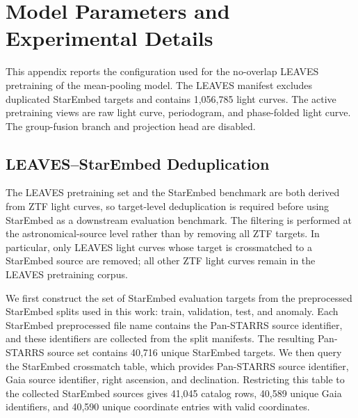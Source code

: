 \section{Model Parameters and Experimental Details}
\label{app:model_parameters_experimental_details}
\providecommand{\modelappendixfigdir}{runs/appendix_figures/mean_pooling_model}

This appendix reports the configuration used for the no-overlap LEAVES pretraining
of the mean-pooling model.  The LEAVES manifest excludes duplicated StarEmbed
targets and contains 1,056,785 light curves.
The active pretraining views are raw light curve, periodogram, and phase-folded
light curve.  The group-fusion branch and projection head are disabled.

\subsection{LEAVES--StarEmbed Deduplication}
\label{app:leaves_starembed_deduplication}

The LEAVES pretraining set and the StarEmbed benchmark are both derived from
ZTF light curves, so target-level deduplication is required before using
StarEmbed as a downstream evaluation benchmark.  The filtering is performed at
the astronomical-source level rather than by removing all ZTF targets.  In
particular, only LEAVES light curves whose target is crossmatched to a
StarEmbed source are removed; all other ZTF light curves remain in the LEAVES
pretraining corpus.

We first construct the set of StarEmbed evaluation targets from the preprocessed
StarEmbed splits used in this work: train, validation, test, and anomaly.  Each
StarEmbed preprocessed file name contains the Pan-STARRS source identifier, and
these identifiers are collected from the split manifests.  The resulting
Pan-STARRS source set contains 40,716 unique StarEmbed targets.  We then query
the StarEmbed crossmatch table, which provides Pan-STARRS source identifier,
Gaia source identifier, right ascension, and declination.  Restricting this
table to the collected StarEmbed sources gives 41,045 catalog rows, 40,589
unique Gaia identifiers, and 40,590 unique coordinate entries with valid
coordinates.

